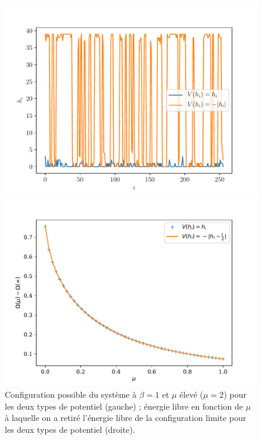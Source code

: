 \begin{figure}
	\begin{minipage}[t]{0.5\linewidth}
		\includegraphics[width=\linewidth]{chap4/comp-potentiels-chimiques.pdf}
	\end{minipage}
	\begin{minipage}[t]{0.5\linewidth}
		\includegraphics[width=\linewidth]{chap4/free-ene-potentiels.pdf}

	\end{minipage}
    \caption{Configuration possible du système à $\beta=1$ et $\mu$ élevé ($\mu=2$) pour les deux types de potentiel (gauche) ; énergie libre en fonction de $\mu$ à laquelle on a retiré l'énergie libre de la configuration limite pour les deux types de potentiel (droite).}
    \label{comp-potentiels-chimiques}
\end{figure}

